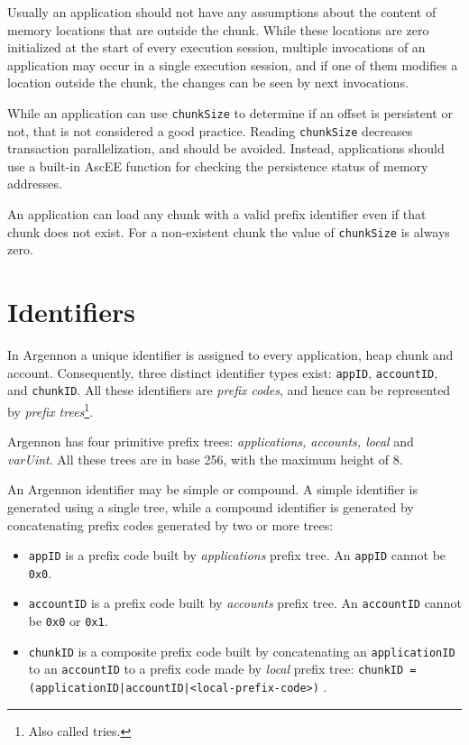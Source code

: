 Usually an application should not have any assumptions about the content of memory locations that are outside the chunk.
While these locations are zero initialized at the start of every execution session, multiple
invocations of an application may occur in a single execution session, and if one of them modifies a location outside
the chunk, the changes can be seen by next invocations.

While an application can use \texttt{chunkSize} to determine if an offset is persistent or not, that is not
considered a good practice. Reading \texttt{chunkSize} decreases transaction parallelization, and should be avoided.
Instead, applications should use a built-in AscEE function for checking the persistence status of memory addresses.

An application can load any chunk with a valid prefix identifier even if that chunk does not exist. For a non-existent
chunk the value of \texttt{chunkSize} is always zero.


\section{Identifiers}\label{sec:identifiers}

In Argennon a unique identifier is assigned to every application, heap chunk and account. Consequently, three distinct
identifier types exist: \texttt{appID}, \texttt{accountID}, and \texttt{chunkID}.
All these identifiers are \emph{prefix codes}, and hence can be represented by
\emph{prefix trees}\footnote{Also called tries.}.

Argennon has four primitive prefix trees: \emph{applications, accounts, local} and \emph{varUint}. All these trees
are in base 256, with the maximum height of 8.

An Argennon identifier may be simple or compound. A simple identifier is generated using a single tree, while a
compound identifier is generated by concatenating prefix codes generated by two or more trees:

\begin{itemize}
    \item \texttt{appID} is a prefix code built by \emph{applications} prefix tree. An \texttt{appID} cannot
    be \texttt{0x0}.

    \item \texttt{accountID} is a prefix code built by \emph{accounts} prefix tree. An \texttt{accountID} cannot
    be \texttt{0x0} or \texttt{0x1}.

    \item \texttt{chunkID} is a composite prefix code built by concatenating an \texttt{applicationID} to
    an \texttt{accountID} to a prefix code made by \emph{local} prefix tree:
    \subitem \texttt{chunkID = (applicationID|accountID|<local-prefix-code>)} .
\end{itemize}

